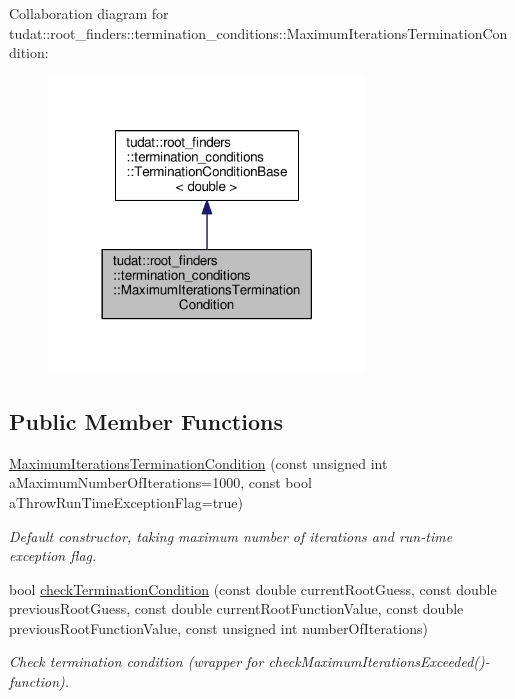 Collaboration diagram for tudat\+:\+:root\+\_\+finders\+:\+:termination\+\_\+conditions\+:\+:Maximum\+Iterations\+Termination\+Condition\+:
\nopagebreak
\begin{figure}[H]
\begin{center}
\leavevmode
\includegraphics[width=237pt]{classtudat_1_1root__finders_1_1termination__conditions_1_1MaximumIterationsTerminationCondition__coll__graph}
\end{center}
\end{figure}
\subsection*{Public Member Functions}
\begin{DoxyCompactItemize}
\item 
\hyperlink{classtudat_1_1root__finders_1_1termination__conditions_1_1MaximumIterationsTerminationCondition_a2ebd3d480db48ed0330daad7b07e8e0d}{Maximum\+Iterations\+Termination\+Condition} (const unsigned int a\+Maximum\+Number\+Of\+Iterations=1000, const bool a\+Throw\+Run\+Time\+Exception\+Flag=true)
\begin{DoxyCompactList}\small\item\em Default constructor, taking maximum number of iterations and run-\/time exception flag. \end{DoxyCompactList}\item 
bool \hyperlink{classtudat_1_1root__finders_1_1termination__conditions_1_1MaximumIterationsTerminationCondition_ac14b8f4f3e4cdd71814dbcca445eef45}{check\+Termination\+Condition} (const double current\+Root\+Guess, const double previous\+Root\+Guess, const double current\+Root\+Function\+Value, const double previous\+Root\+Function\+Value, const unsigned int number\+Of\+Iterations)\hypertarget{classtudat_1_1root__finders_1_1termination__conditions_1_1MaximumIterationsTerminationCondition_ac14b8f4f3e4cdd71814dbcca445eef45}{}\label{classtudat_1_1root__finders_1_1termination__conditions_1_1MaximumIterationsTerminationCondition_ac14b8f4f3e4cdd71814dbcca445eef45}

\begin{DoxyCompactList}\small\item\em Check termination condition (wrapper for check\+Maximum\+Iterations\+Exceeded()-\/function). \end{DoxyCompactList}\end{DoxyCompactItemize}


